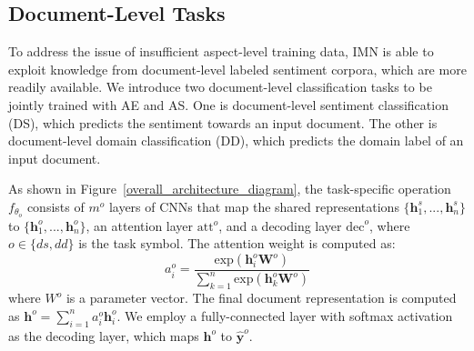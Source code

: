 \documentclass[11pt,a4paper]{article}
\begin{document}
\subsection{Document-Level Tasks}
To address the issue of insufficient aspect-level training data, IMN is able to exploit knowledge from document-level labeled sentiment corpora, which are more readily available. 
We introduce two document-level classification tasks to be jointly trained with AE and AS. One is document-level sentiment classification (DS), which predicts the sentiment towards an input document. The other is document-level domain classification (DD), which predicts the domain label of an input document.

As shown in Figure~\ref{overall_architecture_diagram}, the task-specific operation $f_{\theta_o}$ consists of $m^{o}$ layers of CNNs that map the shared representations $\{\mathbf{h}_1^s, ..., \mathbf{h}_n^s \}$ to $\{\mathbf{h}_1^o, ..., \mathbf{h}_n^o \}$, an attention layer $\text{att}^{o}$, and a decoding layer $\text{dec}^{o}$, where $o \in \{ds, dd\}$ is the task symbol. The attention weight is computed as:
\begin{equation}
    a_i^o = \frac{\text{exp}(\mathbf{h}_i^{o}\mathbf{W}^{o})}{\sum_{k=1}^{n} \text{exp}(\mathbf{h}_k^{o}\mathbf{W}^{o})}
\end{equation}
where $W^{o}$ is a parameter vector. The final document representation is computed as
$\mathbf{h}^{o} = \sum_{i=1}^n a_i^o \mathbf{h}_i^o$. We employ a fully-connected layer with softmax activation as the decoding layer, which maps $\mathbf{h}^o$ to $\hat{\mathbf{y}}^o$.
\end{document}
